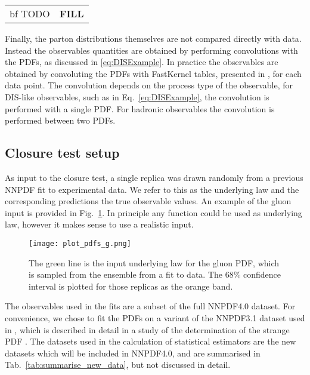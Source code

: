 \begin{table}
    \begin{tabular}[h]{c|c}
        {\rm bf TODO} & {\bf FILL}
    \end{tabular}
\end{table}

Finally, the parton distributions themselves are not compared directly with data.
Instead the observables quantities are obtained by performing convolutions with
the PDFs, as discussed in \ref{eq:DISExample}. In practice the observables are
obtained by convoluting the PDFs with FastKernel tables, presented in
\cite{Ball_2010,Bertone_2017}, for each data point. The convolution depends
on the process type of the observable, for DIS-like observables, such as in
Eq.~\ref{eq:DISExample}, the convolution is performed with a single PDF. For
hadronic observables the convolution is performed between two PDFs.

\subsection{Closure test setup}

As input to the closure test, a single replica was drawn randomly from
a previous NNPDF fit to experimental data. We refer to this as the underlying
law and the corresponding predictions the true observable values. An example
of the gluon input is provided in Fig.~\ref{fig:InputGluonPDF}. In principle
any function could be used as underlying law, however it makes sense to
use a realistic input.

\begin{figure}
    \centering
    \texttt{[image: plot\_pdfs\_g.png]}
    \caption{The green line is the input underlying law for the gluon PDF,
    which is sampled from the ensemble from a fit to data. The 68\% confidence
    interval is plotted for those replicas as the orange band.}
    \label{fig:InputGluonPDF}
\end{figure}


The observables used in the fits are a subset of the full NNPDF4.0 dataset.
For convenience,
we chose to fit the PDFs on a variant of the NNPDF3.1 dataset used in
\cite{Ball_2018}, which is described in detail in a study of the determination
of the strange PDF \cite{Faura_2020}. The datasets used in the calculation of
statistical estimators are the new datasets which will be included in NNPDF4.0,
and are summarised in Tab.~\ref{tab:summarise_new_data}, but not discussed in detail.

